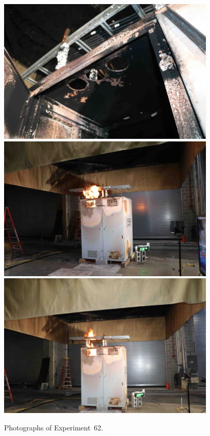 \begin{figure}[p]
\centering
\includegraphics[height=2.75in]{../FIGURES/Test_62_cables} \\
\includegraphics[height=2.75in]{../FIGURES/Test_62_8_min_35_s} \\
\includegraphics[height=2.75in]{../FIGURES/Test_62_9_min_34_s}
\caption[Photographs of Experiment~62]{Photographs of Experiment~62.}
\label{fig:Test_62_photos}
\end{figure}


\clearpage

